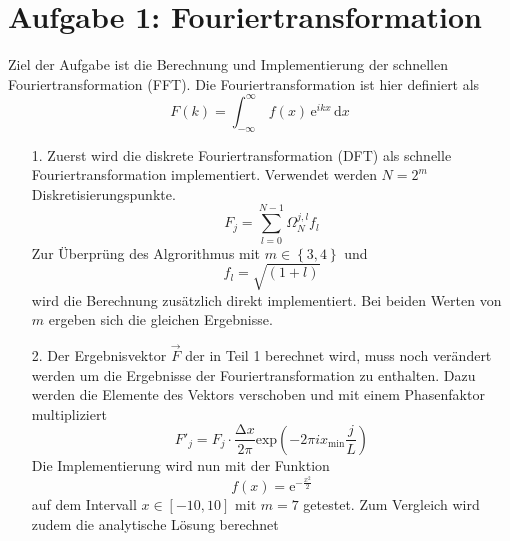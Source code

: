 



\maketitle

\section*{Aufgabe 1: Fouriertransformation}
Ziel der Aufgabe ist die Berechnung und Implementierung der schnellen Fouriertransformation (FFT). Die Fouriertransformation
ist hier definiert als
\begin{equation*}
	F \left(k\right) = \int_{-\infty}^{\infty} \, f(x) \, \text{e}^{ikx} \, \text{d}x
\end{equation*}
\begin{itemize}[leftmargin=*]
\item[1.] Zuerst wird die diskrete Fouriertransformation (DFT) als schnelle Fouriertransformation implementiert. Verwendet
					werden $N = 2^m$ Diskretisierungspunkte.
					\begin{equation*}
						F_j = \sum_{l=0}^{N-1} \Omega_N^{j,l} f_l
					\end{equation*}
					Zur Überprüng des Algrorithmus mit $m \in \left\{3, 4\right\}$ und
					\begin{equation*}
						f_l = \sqrt{(1+l)}
					\end{equation*}
					wird die Berechnung zusätzlich direkt implementiert. Bei beiden Werten von $m$ ergeben sich die gleichen
					Ergebnisse.
\item[2.] Der Ergebnisvektor $\vec{F}$ der in Teil 1 berechnet wird, muss noch verändert werden um die Ergebnisse der
					Fouriertransformation zu enthalten. Dazu werden die Elemente des Vektors verschoben und mit einem Phasenfaktor
					multipliziert
					\begin{equation*}
						F'_j = F_j \cdot \frac{\increment x}{2 \pi} \text{exp}\left(-2 \pi i x_\text{min} \frac{j}{L}\right)
					\end{equation*}
					Die Implementierung wird nun mit der Funktion
					\begin{equation*}
						f\left(x\right) = \text{e}^{-\frac{x^2}{2}}
					\end{equation*}
					auf dem Intervall $x \in \left[-10, 10\right]$ mit $m = 7$ getestet. Zum Vergleich wird zudem die analytische
					Lösung berechnet
					\begin{align*}

\end{align*}
\end{itemize}
